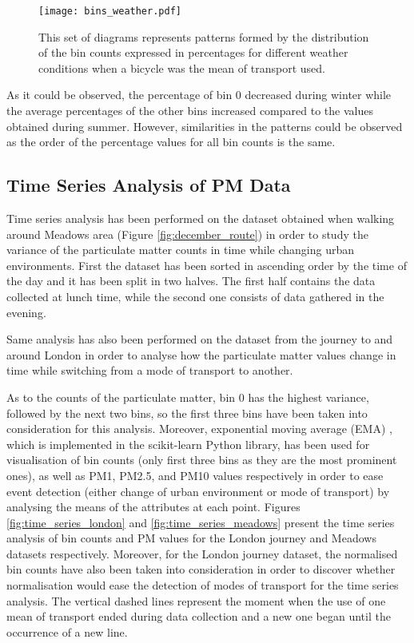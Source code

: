\documentclass[bsc,frontabs,twoside,singlespacing,parskip,deptreport]{infthesis}     %
\begin{document}
\begin{figure}[h!]
  \center
  \texttt{[image: bins\_weather.pdf]} 
  \caption{This set of diagrams represents patterns formed by the distribution of the bin counts expressed in percentages for different weather conditions when a bicycle was the mean of transport used.}
  \label{fig:bins_weather}
\end{figure}

As it could be observed, the percentage of bin 0 decreased during winter while the average percentages of the other bins increased compared to the values obtained during summer. However, similarities in the patterns could be observed as the order of the percentage values for all bin counts is the same.

\subsection{Time Series Analysis of PM Data}

Time series analysis has been performed on the dataset obtained when walking around Meadows area (Figure \ref{fig:december_route}) in order to study the variance of the particulate matter counts in time while changing urban environments. First the dataset has been sorted in ascending order by the time of the day and it has been split in two halves. The first half contains the data collected at lunch time, while the second one consists of data gathered in the evening.

Same analysis has also been performed on the dataset from the journey to and around London in order to analyse how the particulate matter values change in time while switching from a mode of transport to another.

As to the counts of the particulate matter, bin 0 has the highest variance, followed by the next two bins, so the first three bins have been taken into consideration for this analysis. Moreover, exponential moving average (EMA) , which is implemented in the scikit-learn Python library, has been used for visualisation of bin counts (only first three bins as they are the most prominent ones), as well as PM1, PM2.5, and PM10 values respectively in order to ease event detection (either change of urban environment or mode of transport) by analysing the means of the attributes at each point. Figures \ref{fig:time_series_london} and \ref{fig:time_series_meadows} present the time series analysis of bin counts and PM values for the London journey and Meadows datasets respectively. Moreover, for the London journey dataset, the normalised bin counts have also been taken into consideration in order to discover whether normalisation would ease the detection of modes of transport for the time series analysis. The vertical dashed lines represent the moment when the use of one mean of transport ended during data collection and a new one began until the occurrence of a new line.
\end{document}
